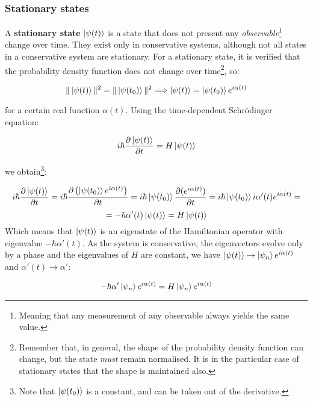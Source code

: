 \subsubsection{Stationary states}

A \textbf{stationary state} $\ket{\psi(t)}$ is a state that does not present any \textit{observable}\footnote{Meaning that any measurement of any observable always yields the same value.} change over time. They exist only in conservative systems, although not all states in a conservative system are stationary. For a stationary state, it is verified that the probability density function does not change over time\footnote{Remember that, in general, the shape of the probability density function can change, but the state \textit{must} remain normalised. It is in the particular case of stationary states that the shape is maintained also.}, so:

\begin{equation}
    \|\ket{\psi(t)}\|^2 = \|\ket{\psi(t_0)}\|^2 \Longrightarrow \ket{\psi(t)} = \ket{\psi(t_0)}e^{i\alpha(t)}
\end{equation}

for a certain real function $\alpha(t)$. Using the time-dependent Schrödinger equation:

\begin{equation}
    i \hbar \frac{\partial \ket{\psi(t)}}{\partial t} = H  \ket{\psi(t)}
\end{equation}

we obtain\footnote{Note that $\ket{\psi(t_0)}$ is a constant, and can be taken out of the derivative.}:

\begin{equation*}
    i\hbar \frac{\partial \ket{\psi(t)}}{\partial t} = i \hbar \frac{\partial \left(\ket{\psi(t_0)}e^{i\alpha(t)}\right)}{\partial t} = i\hbar \ket{\psi(t_0)} \frac{\partial (e^{i\alpha(t)})}{\partial t} = i\hbar \ket{\psi(t_0)} i \alpha'(t)e^{i\alpha(t)} = 
\end{equation*}
\begin{equation}
    = -\hbar \alpha'(t)\ket{\psi(t)} = H \ket{\psi(t)}
\end{equation}
Which means that $\ket{\psi(t)}$ is an eigenstate of the Hamiltonian operator with eigenvalue $-\hbar \alpha'(t)$. As the system is conservative, the eigenvectors evolve only by a phase and the eigenvalues of $H$ are constant, we have $\ket{\psi(t)}\to\ket{\psi_n}e^{i\alpha(t)}$ and $\alpha'(t)\to \alpha'$:

\begin{equation}
    -\hbar \alpha'\ket{\psi_n}e^{i\alpha(t)} = H \ket{\psi_n}e^{i\alpha(t)}
\end{equation}

